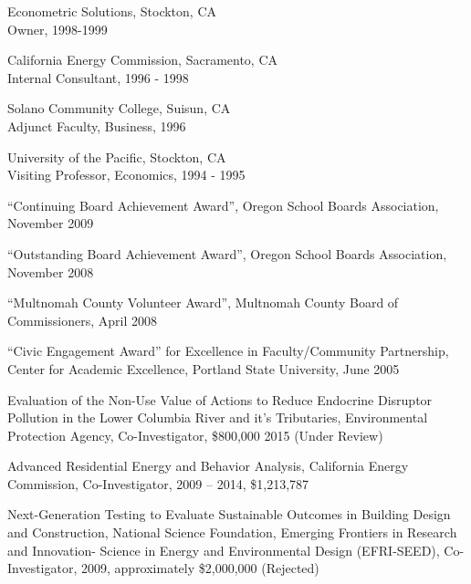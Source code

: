\documentclass[Computer Science]{vita}
\begin{document}
\begin{vita}
\begin{Experience}
  \item Econometric Solutions, Stockton, CA\\
    Owner, 1998-1999
		
  \item California Energy Commission, Sacramento, CA\\
    Internal Consultant, 1996 - 1998
	
  \item Solano Community College, Suisun, CA\\
    Adjunct Faculty, Business, 1996
		
  \item University of the Pacific, Stockton, CA\\
    Visiting Professor, Economics, 1994 - 1995

  \end{Experience}

  \begin{Honors}

  \item ``Continuing Board Achievement Award'', Oregon School Boards Association, November 2009

\item ``Outstanding Board Achievement Award'', Oregon School Boards Association, November 2008

\item ``Multnomah County Volunteer Award'', Multnomah County Board of Commissioners, April 2008

  \item ``Civic Engagement Award'' for Excellence in Faculty/Community
    Partnership, Center for Academic Excellence, Portland State
    University, June 2005

  \end{Honors}

  \begin{Grants and Sponsored Research}
\item Evaluation of the Non-Use Value of Actions to Reduce Endocrine Disruptor Pollution in the Lower Columbia River and it's Tributaries, Environmental Protection Agency, Co-Investigator, \$800,000 2015 (Under Review)

\item Advanced Residential Energy and Behavior Analysis, California Energy Commission, Co-Investigator, 2009 -- 2014, \$1,213,787
  
\item Next-Generation Testing to Evaluate Sustainable Outcomes in Building Design and Construction, National Science Foundation, Emerging Frontiers in Research and Innovation- Science in Energy and Environmental Design (EFRI-SEED), Co-Investigator, 2009, approximately \$2,000,000 (Rejected)


\end{Grants and Sponsored Research}
\end{vita}
\end{document}
